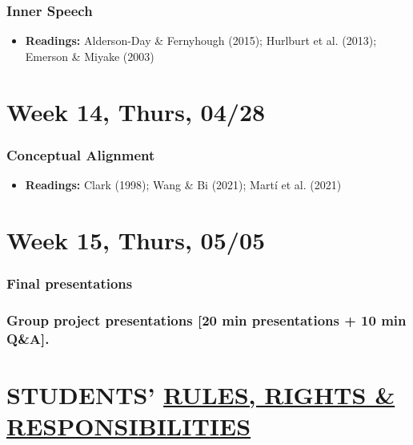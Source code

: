 \documentclass[11pt,man]{article}
\providecommand{\tightlist}{%
  \setlength{\itemsep}{0pt}\setlength{\parskip}{0pt}}
\begin{document}
\hypertarget{inner-speech}{%
\subsubsection{Inner Speech}\label{inner-speech}}

\begin{itemize}
\tightlist
\item
  \textbf{Readings:} Alderson-Day \& Fernyhough (2015); Hurlburt et al.
  (2013); Emerson \& Miyake (2003)
\end{itemize}

\hypertarget{week-14-thurs-0428}{%
\section{Week 14, Thurs, 04/28}\label{week-14-thurs-0428}}

\hypertarget{conceptual-alignment}{%
\subsubsection{Conceptual Alignment}\label{conceptual-alignment}}

\begin{itemize}
\tightlist
\item
  \textbf{Readings:} Clark (1998); Wang \& Bi (2021); Martí et al.
  (2021)
\end{itemize}

\hypertarget{week-15-thurs-0505}{%
\section{Week 15, Thurs, 05/05}\label{week-15-thurs-0505}}

\hypertarget{final-presentations}{%
\subsubsection{Final presentations}\label{final-presentations}}

\hypertarget{group-project-presentations-20-min-presentations-10-min-qa.}{%
\subsubsection{Group project presentations {[}20 min presentations + 10
min
Q\&A{]}.}\label{group-project-presentations-20-min-presentations-10-min-qa.}}

\newpage

\hypertarget{students-rules-rights-responsibilities}{%
\section{\texorpdfstring{STUDENTS'
\href{https://guide.wisc.edu/graduate/}{RULES, RIGHTS \&
RESPONSIBILITIES}}{STUDENTS' RULES, RIGHTS \& RESPONSIBILITIES}}\label{students-rules-rights-responsibilities}}
\end{document}
